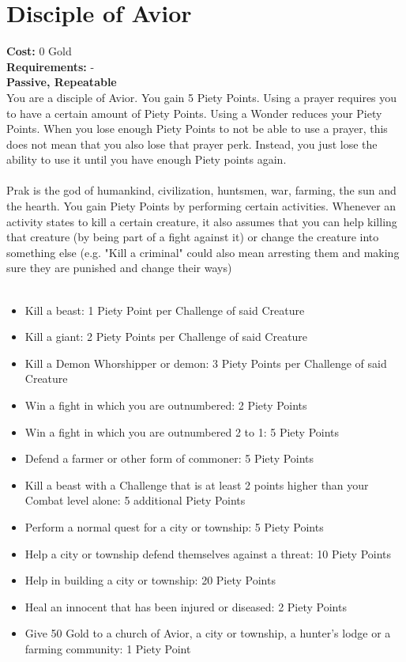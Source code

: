 \section{Disciple of Avior}
\textbf{Cost:} 0 Gold\\
\textbf{Requirements:} - \\
\textbf{Passive, Repeatable}\\
You are a disciple of Avior. You gain 5 Piety Points. Using a prayer requires you to have a certain amount of Piety Points. Using a Wonder reduces your Piety Points. When you lose enough Piety Points to not be able to use a prayer, this does not mean that you also lose that prayer perk. Instead, you just lose the ability to use it until you have enough Piety points again.\\
\\
Prak is the god of humankind, civilization, huntsmen, war, farming, the sun and the hearth. You gain Piety Points by performing certain activities. Whenever an activity states to kill a certain creature, it also assumes that you can help killing that creature (by being part of a fight against it) or change the creature into something else (e.g. "Kill a criminal" could also mean arresting them and making sure they are punished and change their ways)\\
\\
\begin{itemize}
	\item Kill a beast: 1 Piety Point per Challenge of said Creature
	\item Kill a giant: 2 Piety Points per Challenge of said Creature
	\item Kill a Demon Whorshipper or demon: 3 Piety Points per Challenge of said Creature
	\item Win a fight in which you are outnumbered: 2 Piety Points
	\item Win a fight in which you are outnumbered 2 to 1: 5 Piety Points
	\item Defend a farmer or other form of commoner: 5 Piety Points
	\item Kill a beast with a Challenge that is at least 2 points higher than your Combat level alone: 5 additional Piety Points
	\item Perform a normal quest for a city or township: 5 Piety Points
	\item Help a city or township defend themselves against a threat: 10 Piety Points
	\item Help in building a city or township: 20 Piety Points
	\item Heal an innocent that has been injured or diseased: 2 Piety Points
	\item Give 50 Gold to a church of Avior, a city or township, a hunter's lodge or a farming community: 1 Piety Point
\end{itemize}

